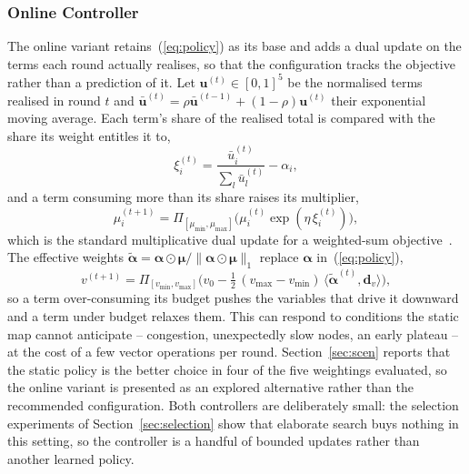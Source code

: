 \documentclass[journal]{IEEEtran}
\newcommand{\valpha}{\boldsymbol{\alpha}}
\newcommand{\vd}{\mathbf{d}}
\begin{document}
\subsubsection{Online Controller}
The online variant retains~(\ref{eq:policy}) as its base and adds a dual update
on the terms each round actually realises, so that the configuration tracks the
objective rather than a prediction of it. Let
$\mathbf{u}^{(t)}\in[0,1]^5$ be the normalised terms realised in round $t$ and
$\bar{\mathbf{u}}^{(t)}=\rho\bar{\mathbf{u}}^{(t-1)}+(1-\rho)\mathbf{u}^{(t)}$
their exponential moving average. Each term's share of the realised total is
compared with the share its weight entitles it to,
\begin{equation}
\xi^{(t)}_i=\frac{\bar{u}^{(t)}_i}{\sum_l\bar{u}^{(t)}_l}-\alpha_i,
\label{eq:share}
\end{equation}
and a term consuming more than its share raises its multiplier,
\begin{equation}
\mu^{(t+1)}_i=\Pi_{[\mu_{\min},\mu_{\max}]}\big(\mu^{(t)}_i\exp(\eta\,\xi^{(t)}_i)\big),
\label{eq:mult}
\end{equation}
which is the standard multiplicative dual update for a weighted-sum
objective~\cite{boyd2004convex}. The effective weights
$\tilde{\valpha}=\valpha\odot\boldsymbol{\mu}/\|\valpha\odot\boldsymbol{\mu}\|_1$
replace $\valpha$ in~(\ref{eq:policy}),
\begin{equation}
v^{(t+1)}=\Pi_{[v_{\min},v_{\max}]}\Big(v_0-\tfrac12\,(v_{\max}-v_{\min})\,
 \langle\tilde{\valpha}^{(t)},\vd_v\rangle\Big),
\label{eq:onlinepolicy}
\end{equation}
so a term over-consuming its budget pushes the variables that drive it
downward and a term under budget relaxes them. This can respond to conditions
the static map cannot anticipate -- congestion, unexpectedly slow nodes, an
early plateau -- at the cost of a few vector operations per round.
Section~\ref{sec:scen} reports that the static policy is the better choice in
four of the five weightings evaluated, so the online variant is presented as an
explored alternative rather than the recommended configuration. Both
controllers are deliberately small: the selection experiments of
Section~\ref{sec:selection} show that elaborate search buys nothing in this
setting, so the controller is a handful of bounded updates rather than another
learned policy.
\end{document}
